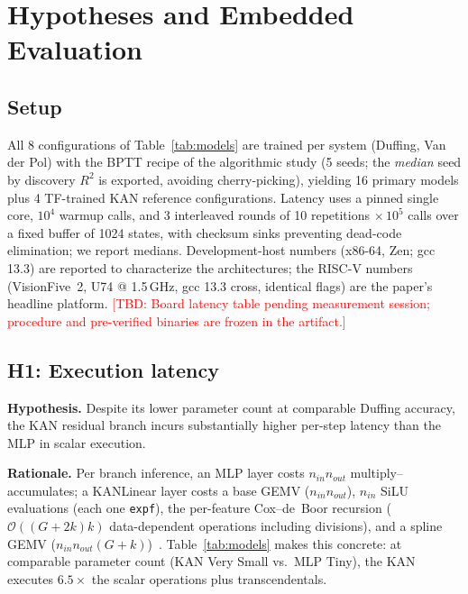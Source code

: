 \documentclass[conference]{IEEEtran}
\newcommand{\tbd}[1]{\textcolor{red}{[TBD: #1]}}
\newcommand{\Rsq}{R^2}
\begin{document}
\section{Hypotheses and Embedded Evaluation}
\label{sec:eval}

\subsection{Setup}

All 8 configurations of Table~\ref{tab:models} are trained per system
(Duffing, Van der Pol) with the BPTT recipe of the algorithmic study (5 seeds;
the \emph{median} seed by discovery $\Rsq$ is exported, avoiding
cherry-picking), yielding 16 primary models plus 4 TF-trained KAN reference
configurations. Latency uses a pinned single core, $10^4$ warmup calls, and 3
interleaved rounds of 10 repetitions $\times\,10^5$ calls over a fixed buffer
of 1024 states, with checksum sinks preventing dead-code elimination; we
report medians. Development-host numbers (x86-64, Zen; gcc 13.3) are reported
to characterize the architectures; the RISC-V numbers
(VisionFive~2, U74 @ 1.5\,GHz, gcc 13.3 cross, identical flags) are the
paper's headline platform. \tbd{Board latency table pending measurement
session; procedure and pre-verified binaries are frozen in the artifact.}

\subsection{H1: Execution latency}
\label{sec:h1}

\textbf{Hypothesis.} Despite its lower parameter count at comparable Duffing
accuracy, the KAN residual branch incurs substantially higher per-step latency
than the MLP in scalar execution.

\textbf{Rationale.} Per branch inference, an MLP layer costs $n_{in}n_{out}$
multiply--accumulates; a KANLinear layer costs a base GEMV
($n_{in}n_{out}$), $n_{in}$ SiLU evaluations (each one \texttt{expf}), the
per-feature Cox--de~Boor recursion ($\mathcal{O}((G{+}2k)k)$ data-dependent
operations including divisions), and a spline GEMV
($n_{in}n_{out}(G{+}k)$)~\cite{khalidHW_PLACEHOLDER,huang2025hardware}.
Table~\ref{tab:models} makes this concrete: at comparable parameter count
(KAN Very Small vs.\ MLP Tiny), the KAN executes $6.5\times$ the scalar
operations plus transcendentals.
\end{document}

